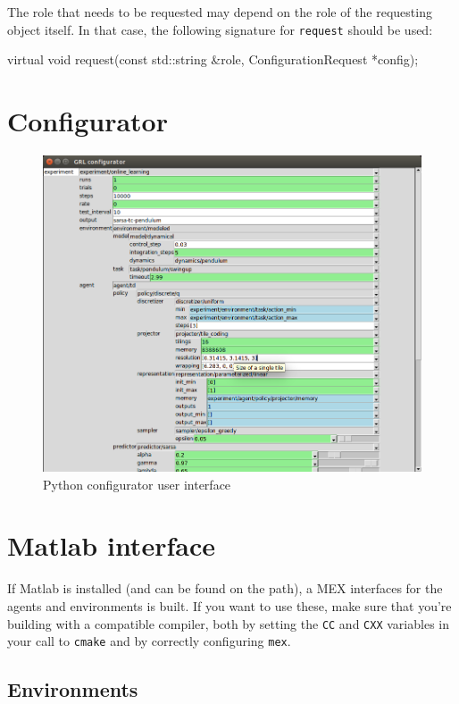 \documentclass{article}
\newcommand{\txt}[1]{\texttt{#1}}
\newenvironment{code}{\alltt}{\endalltt}
\begin{document}
The role that needs to be requested may depend on the role of the requesting
object itself. In that case, the following signature for \txt{request}
should be used:

\begin{code}
virtual void request(const std::string \&role, ConfigurationRequest *config);
\end{code}

\section{Configurator}
\label{sec:grlc}

\begin{figure}[H]
\includegraphics[width=\linewidth]{grl.png}
\caption{Python configurator user interface}
\label{fig:conf}
\end{figure}

\section{Matlab interface}

If Matlab is installed (and can be found on the path), a MEX interfaces for
the agents and environments is built. If you want to use these, make sure
that you're building with a compatible compiler, both by setting the
\txt{CC} and \txt{CXX} variables in your call to \txt{cmake} and by correctly
configuring \txt{mex}.

\subsection{Environments}
\end{document}
